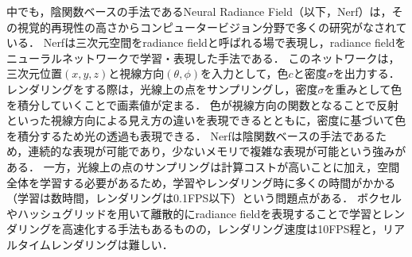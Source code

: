 中でも，陰関数ベースの手法であるNeural Radiance Field（以下，Nerf）\cite{nerf}は，その視覚的再現性の高さからコンピュータービジョン分野で多くの研究がなされている．
Nerfは三次元空間をradiance fieldと呼ばれる場で表現し，radiance fieldをニューラルネットワークで学習・表現した手法である．
このネットワークは，三次元位置$(x,y,z)$と視線方向$(\theta, \phi)$を入力として，色$c$と密度$\sigma$を出力する．
レンダリングをする際は，光線上の点をサンプリングし，密度$\sigma$を重みとして色を積分していくことで画素値が定まる．
色が視線方向の関数となることで反射といった視線方向による見え方の違いを表現できるとともに，密度に基づいて色を積分するため光の透過も表現できる．
Nerfは陰関数ベースの手法であるため，連続的な表現が可能であり，少ないメモリで複雑な表現が可能という強みがある．
一方，光線上の点のサンプリングは計算コストが高いことに加え，空間全体を学習する必要があるため，学習やレンダリング時に多くの時間がかかる（学習は数時間，レンダリングは0.1FPS以下）という問題点がある\cite{3dgs}．
ボクセルやハッシュグリッドを用いて離散的にradiance fieldを表現することで学習とレンダリングを高速化する手法もある\cite{plenoxels}\cite{instant-ngp}ものの，レンダリング速度は10FPS程と，リアルタイムレンダリングは難しい．




